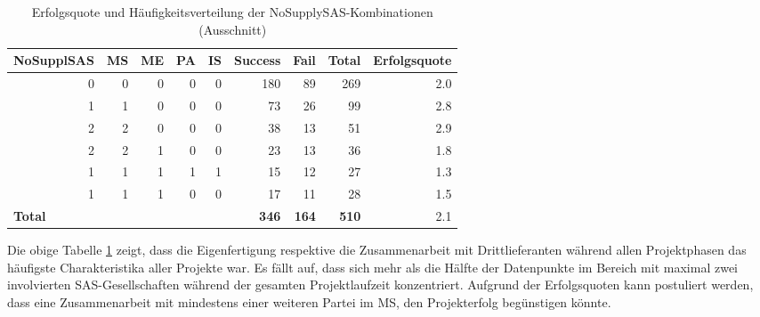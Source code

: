 \begin{table}[H]
	\centering
	\caption{Erfolgsquote und Häufigkeitsverteilung der NoSupplySAS-Kombinationen (Ausschnitt)}
	\begin{tabular}{lrrrrrrrr}
		\textbf{NoSupplSAS} & \multicolumn{1}{l}{\textbf{MS}} & \multicolumn{1}{l}{\textbf{ME}} & \multicolumn{1}{l}{\textbf{PA}} & \multicolumn{1}{l}{\textbf{IS}} & \multicolumn{1}{l}{\textbf{Success}} & \multicolumn{1}{l}{\textbf{Fail}} & \multicolumn{1}{l}{\textbf{Total}} & \multicolumn{1}{l}{\textbf{Erfolgsquote}} \\ \hline
		\multicolumn{1}{r}{0} & 0     & 0     & 0     & 0     & 180   & 89    & 269 & 2.0 \\
		\multicolumn{1}{r}{1} & 1     & 0     & 0     & 0     & 73    & 26    & 99  & 2.8 \\
		\multicolumn{1}{r}{2} & 2     & 0     & 0     & 0     & 38    & 13    & 51  & 2.9 \\
		\multicolumn{1}{r}{2} & 2     & 1     & 0     & 0     & 23    & 13    & 36  & 1.8 \\
		\multicolumn{1}{r}{1} & 1     & 1     & 1     & 1     & 15    & 12    & 27  & 1.3 \\
		\multicolumn{1}{r}{1} & 1     & 1     & 0     & 0     & 17    & 11    & 28  & 1.5 \\ \hline
		\textbf{Total} &       &       &       &       & \textbf{346} & \textbf{164} & \textbf{510} & 2.1 \\
	\end{tabular}%
	\label{fnosas}%
\end{table}%
Die obige Tabelle \ref{fnosas} zeigt, dass die Eigenfertigung respektive die Zusammenarbeit mit Drittlieferanten während allen Projektphasen das häufigste Charakteristika aller Projekte war. Es fällt auf, dass sich mehr als die Hälfte der Datenpunkte im Bereich mit maximal zwei involvierten SAS-Gesellschaften während der gesamten Projektlaufzeit konzentriert. Aufgrund der Erfolgsquoten kann postuliert werden, dass eine Zusammenarbeit mit mindestens einer weiteren Partei im MS, den Projekterfolg begünstigen könnte.
\newpage

